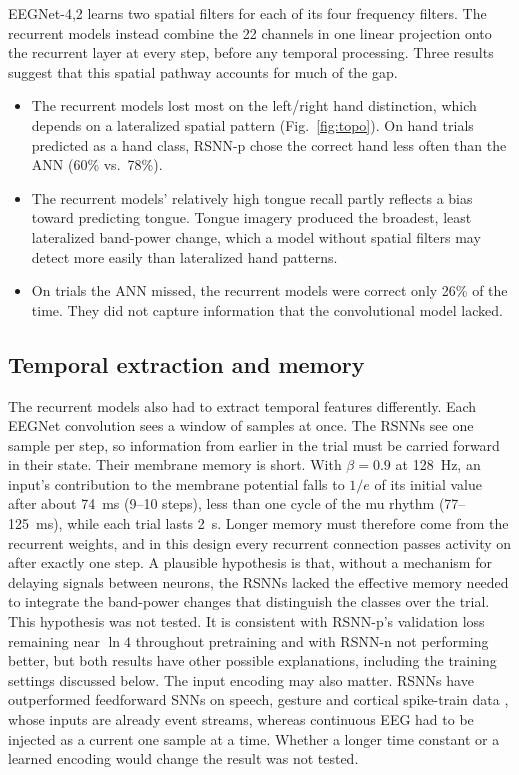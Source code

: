 \documentclass[conference]{IEEEtran}
\begin{document}
EEGNet-4,2 learns two spatial filters for each of its four frequency filters. The recurrent models instead combine the 22 channels in one linear projection onto the recurrent layer at every step, before any temporal processing. Three results suggest that this spatial pathway accounts for much of the gap.
\begin{itemize}
  \item The recurrent models lost most on the left/right hand distinction, which depends on a lateralized spatial pattern (Fig.~\ref{fig:topo}). On hand trials predicted as a hand class, RSNN-p chose the correct hand less often than the ANN (60\% vs.\ 78\%).
  \item The recurrent models' relatively high tongue recall partly reflects a bias toward predicting tongue. Tongue imagery produced the broadest, least lateralized band-power change, which a model without spatial filters may detect more easily than lateralized hand patterns.
  \item On trials the ANN missed, the recurrent models were correct only 26\% of the time. They did not capture information that the convolutional model lacked.
\end{itemize}

\subsection{Temporal extraction and memory}

The recurrent models also had to extract temporal features differently. Each EEGNet convolution sees a window of samples at once. The RSNNs see one sample per step, so information from earlier in the trial must be carried forward in their state. Their membrane memory is short. With $\beta = 0.9$ at 128~Hz, an input's contribution to the membrane potential falls to $1/e$ of its initial value after about 74~ms (9--10 steps), less than one cycle of the mu rhythm (77--125~ms), while each trial lasts 2~s. Longer memory must therefore come from the recurrent weights, and in this design every recurrent connection passes activity on after exactly one step. A plausible hypothesis is that, without a mechanism for delaying signals between neurons, the RSNNs lacked the effective memory needed to integrate the band-power changes that distinguish the classes over the trial. This hypothesis was not tested. It is consistent with RSNN-p's validation loss remaining near $\ln 4$ throughout pretraining and with RSNN-n not performing better, but both results have other possible explanations, including the training settings discussed below. The input encoding may also matter. RSNNs have outperformed feedforward SNNs on speech, gesture and cortical spike-train data \cite{yin2021,liu2025,liu2024}, whose inputs are already event streams, whereas continuous EEG had to be injected as a current one sample at a time. Whether a longer time constant or a learned encoding would change the result was not tested.
\end{document}
